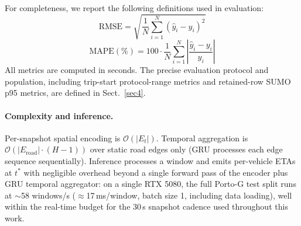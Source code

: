 For completeness, we report the following definitions used in evaluation:
\begin{equation}
\mathrm{RMSE} = \sqrt{\frac{1}{N}\sum_{i=1}^{N} (\hat{y}_i - y_i)^2}
\end{equation}
\begin{equation}
\mathrm{MAPE}(\%) = 100\cdot \frac{1}{N}\sum_{i=1}^{N} \left|\frac{\hat{y}_i - y_i}{y_i}\right|
\end{equation}
All metrics are computed in seconds. The precise evaluation protocol and population, including trip-start protocol-range metrics and retained-row SUMO p95 metrics, are defined in Sect.~\ref{sec4}.

\paragraph{Complexity and inference.}
Per-snapshot spatial encoding is $\mathcal{O}(|E_t|)$. Temporal aggregation is $\mathcal{O}(|E_\text{road}|\cdot(H{-}1))$ over static road edges only (GRU processes each edge sequence sequentially). Inference processes a window and emits per-vehicle ETAs at $t^*$ with negligible overhead beyond a single forward pass of the encoder plus GRU temporal aggregator: on a single RTX 5080, the full Porto-G test split runs at $\sim$58 windows/s ($\approx$17\,ms/window, batch size 1, including data loading), well within the real-time budget for the 30\,s snapshot cadence used throughout this work.

